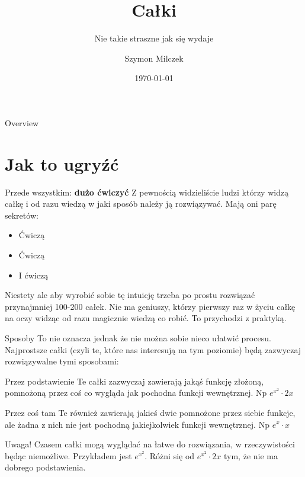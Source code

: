 \documentclass[aspectratio=169,xcolor=dvipsnames]{beamer}
\title[short title]{Całki}
\subtitle{Nie takie straszne jak się wydaje}
\author{Szymon Milczek}
\date{\today} %
\begin{document}
\begin{frame}
    \titlepage
\end{frame}

\begin{frame}{Overview}
    \tableofcontents
\end{frame}

\section{Jak to ugryźć}

\begin{frame}{Przede wszystkim: \textbf{dużo ćwiczyć}}
    Z pewnością widzieliście ludzi którzy widzą całkę i od razu wiedzą w jaki sposób należy ją rozwiązywać. Mają oni parę sekretów:
    \begin{itemize}
        \item Ćwiczą
        \item Ćwiczą
        \item I ćwiczą
    \end{itemize}
    Niestety ale aby wyrobić sobie tę intuicję trzeba po prostu rozwiązać przynajmniej 100-200 całek. Nie ma geniuszy, którzy pierwszy raz w życiu całkę na oczy widząc od razu magicznie wiedzą co robić. To przychodzi z praktyką.
\end{frame}


\begin{frame}{Sposoby}
    To nie oznacza jednak że nie można sobie nieco ułatwić procesu. Najprostsze całki (czyli te, które nas interesują na tym poziomie) będą zazwyczaj rozwiązywalne tymi sposobami:

    \begin{block}{Przez podstawienie}
        Te całki zazwyczaj zawierają jakąś funkcję złożoną, pomnożoną przez coś co wygląda jak pochodna funkcji wewnętrznej. Np $e^{x^2}\cdot 2x$
    \end{block}

    \begin{block}{Przez coś tam}
        Te również zawierają jakieś dwie pomnożone przez siebie funkcje, ale żadna z nich nie jest pochodną jakiejkolwiek funkcji wewnętrznej. Np $e^x \cdot x$
    \end{block}
    
    \begin{alertblock}{Uwaga!}
        Czasem całki mogą wyglądać na łatwe do rozwiązania, w rzeczywistości będąc niemożliwe. Przykładem jest $e^{x^2}$. Różni się od $e^{x^2}\cdot 2x$ tym, że nie ma dobrego podstawienia.
    \end{alertblock}

\end{frame}
\end{document}
